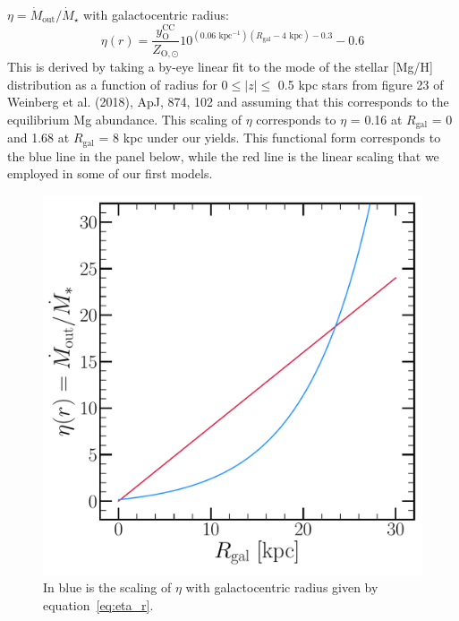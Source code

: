\documentclass[12pt]{report}
\begin{document}
$\eta = \dot{M}_\text{out}/\dot{M}_\star$ with galactocentric radius: 
\begin{equation} 
\label{eq:eta_r} 
\eta(r) = \frac{y_\text{O}^\text{CC}}{Z_{\text{O},\odot}} 
10^{(0.06\text{ kpc}^{-1})(R_\text{gal} - 4\text{ kpc}) - 0.3} - 0.6 
\end{equation}
This is derived by taking a by-eye linear fit to the mode of the stellar 
[Mg/H] distribution as a function of radius for $0 \leq |z| \leq$ 0.5 kpc 
stars from figure 23 of Weinberg et al. (2018), ApJ, 874, 102 and assuming 
that this corresponds to the equilibrium Mg abundance. This scaling of $\eta$ 
corresponds to $\eta$ = 0.16 at $R_\text{gal}$ = 0 and 1.68 at $R_\text{gal}$ 
= 8 kpc under our yields. This functional form corresponds to the blue line 
in the panel below, while the red line is the linear scaling that we employed 
in some of our first models. 

\begin{figure}[!h] 
\centering 
\includegraphics[scale = 0.5]{../plots/eta_r.pdf} 
\caption{In blue is the scaling of $\eta$ with galactocentric radius given by 
equation~\ref{eq:eta_r}.}
\end{figure}
\end{document}
